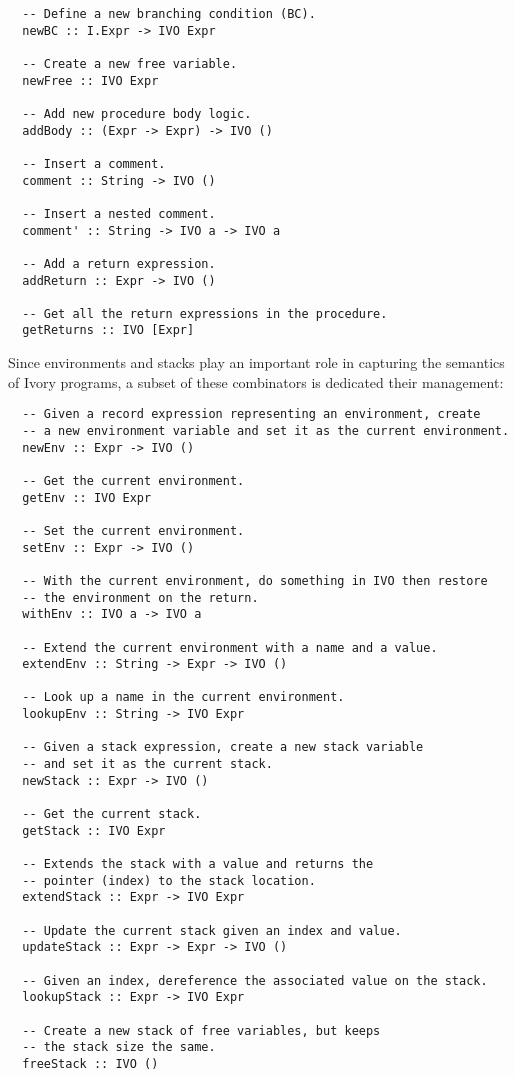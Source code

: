 \documentclass{article}
\begin{document}
\begin{lstlisting}
  -- Define a new branching condition (BC).
  newBC :: I.Expr -> IVO Expr
  
  -- Create a new free variable.
  newFree :: IVO Expr
  
  -- Add new procedure body logic.
  addBody :: (Expr -> Expr) -> IVO ()
  
  -- Insert a comment.
  comment :: String -> IVO ()
  
  -- Insert a nested comment.
  comment' :: String -> IVO a -> IVO a
  
  -- Add a return expression.
  addReturn :: Expr -> IVO ()
  
  -- Get all the return expressions in the procedure.
  getReturns :: IVO [Expr]
\end{lstlisting}

Since environments and stacks play an important role
in capturing the semantics of Ivory programs, 
a subset of these combinators is dedicated their
management:

\begin{lstlisting}
  -- Given a record expression representing an environment, create
  -- a new environment variable and set it as the current environment.
  newEnv :: Expr -> IVO ()
  
  -- Get the current environment.
  getEnv :: IVO Expr
  
  -- Set the current environment.
  setEnv :: Expr -> IVO ()
  
  -- With the current environment, do something in IVO then restore
  -- the environment on the return.
  withEnv :: IVO a -> IVO a
  
  -- Extend the current environment with a name and a value.
  extendEnv :: String -> Expr -> IVO ()
  
  -- Look up a name in the current environment.
  lookupEnv :: String -> IVO Expr

  -- Given a stack expression, create a new stack variable
  -- and set it as the current stack.
  newStack :: Expr -> IVO ()
  
  -- Get the current stack.
  getStack :: IVO Expr
  
  -- Extends the stack with a value and returns the
  -- pointer (index) to the stack location.
  extendStack :: Expr -> IVO Expr
  
  -- Update the current stack given an index and value.
  updateStack :: Expr -> Expr -> IVO ()
  
  -- Given an index, dereference the associated value on the stack.
  lookupStack :: Expr -> IVO Expr
  
  -- Create a new stack of free variables, but keeps
  -- the stack size the same.
  freeStack :: IVO ()
\end{lstlisting}
\end{document}
